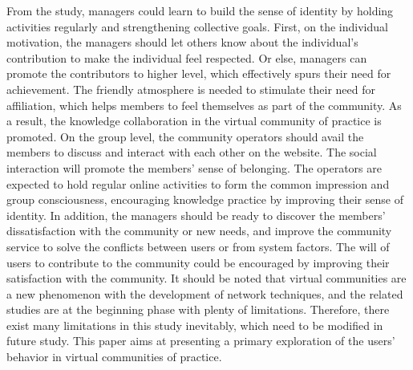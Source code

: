 \documentclass{elsarticle}
\begin{document}
From the study, managers could learn to build the sense of identity by holding activities regularly and strengthening collective goals. First, on the individual motivation, the managers should let others know about the individual’s contribution to make the individual feel respected. Or else, managers can promote the contributors to higher level, which effectively spurs their need for achievement. The friendly atmosphere is needed to stimulate their need for affiliation, which helps members to feel themselves as part of the community. As a result, the knowledge collaboration in the virtual community of practice is promoted. On the group level, the community operators should avail the members to discuss and interact with each other on the website. The social interaction will promote the members’ sense of belonging. The operators are expected to hold regular online activities to form the common impression and group consciousness, encouraging knowledge practice by improving their sense of identity. In addition, the managers should be ready to discover the members’ dissatisfaction with the community or new needs, and improve the community service to solve the conflicts between users or from system factors. The will of users to contribute to the community could be encouraged by improving their satisfaction with the community. 
It should be noted that virtual communities are a new phenomenon with the development of network techniques, and the related studies are at the beginning phase with plenty of limitations. Therefore, there exist many limitations in this study inevitably, which need to be modified in future study. This paper aims at presenting a primary exploration of the users’ behavior in virtual communities of practice. 
\end{document}
